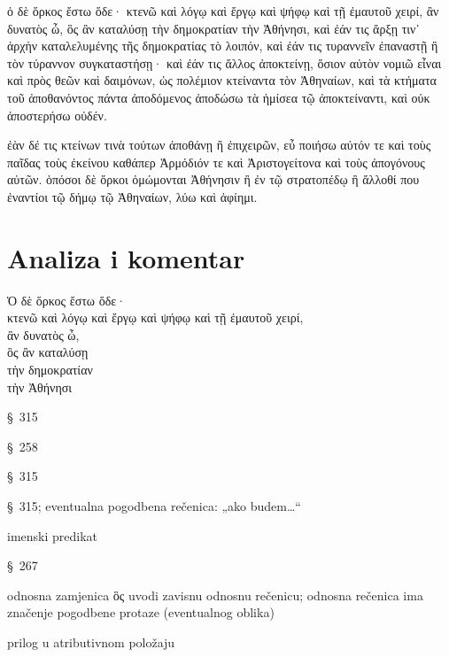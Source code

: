 {\large

\begin{greek}

\noindent ὁ δὲ ὅρκος ἔστω ὅδε· κτενῶ καὶ λόγῳ καὶ ἔργῳ καὶ ψήφῳ καὶ τῇ ἐμαυτοῦ χειρί, ἂν δυνατὸς ὦ, ὃς ἂν καταλύσῃ τὴν δημοκρατίαν τὴν Ἀθήνησι, καὶ ἐάν τις ἄρξῃ τιν᾽ ἀρχὴν καταλελυμένης τῆς δημοκρατίας τὸ λοιπόν, καὶ ἐάν τις τυραννεῖν ἐπαναστῇ ἢ τὸν τύραννον συγκαταστήσῃ· καὶ ἐάν τις ἄλλος ἀποκτείνῃ, ὅσιον αὐτὸν νομιῶ εἶναι καὶ πρὸς θεῶν καὶ δαιμόνων, ὡς πολέμιον κτείναντα τὸν Ἀθηναίων, καὶ τὰ κτήματα τοῦ ἀποθανόντος πάντα ἀποδόμενος ἀποδώσω τὰ ἡμίσεα τῷ ἀποκτείναντι, καὶ οὐκ ἀποστερήσω οὐδέν.

ἐὰν δέ τις κτείνων τινὰ τούτων ἀποθάνῃ ἢ ἐπιχειρῶν, εὖ ποιήσω αὐτόν τε καὶ τοὺς παῖδας τοὺς ἐκείνου καθάπερ Ἁρμόδιόν τε καὶ Ἀριστογείτονα καὶ τοὺς ἀπογόνους αὐτῶν. ὁπόσοι δὲ ὅρκοι ὀμώμονται Ἀθήνησιν ἢ ἐν τῷ στρατοπέδῳ ἢ ἄλλοθί που ἐναντίοι τῷ δήμῳ τῷ Ἀθηναίων, λύω καὶ ἀφίημι.

\end{greek}

}


\section*{Analiza i komentar}


{\large
\begin{greek}
\noindent Ὁ δὲ ὅρκος ἔστω ὅδε·  \\
\tabto{2em} κτενῶ καὶ λόγῳ καὶ ἔργῳ καὶ ψήφῳ καὶ τῇ ἐμαυτοῦ χειρί, \\
\tabto{4em} ἂν δυνατὸς ὦ, \\
\tabto{2em} ὃς ἂν καταλύσῃ \\
\tabto{4em} τὴν δημοκρατίαν \\
\tabto{6em} τὴν Ἀθήνησι\\

\end{greek}
}

\begin{description}[noitemsep]
\item[ἔστω] §~315
\item[κτενῶ] §~258
\item[ὦ] §~315
\item[ἂν δυνατὸς ὦ] §~315; eventualna pogodbena rečenica: „ako budem…“
\item[δυνατὸς ὦ] imenski predikat
\item[καταλύσῃ] §~267
\item[ὃς ἂν καταλύσῃ] odnosna zamjenica ὃς uvodi zavisnu odnosnu rečenicu; odnosna rečenica ima značenje pogodbene protaze (eventualnog oblika)
\item[τὴν δημοκρατίαν τὴν Ἀθήνησι] prilog u atributivnom položaju

\end{description}

